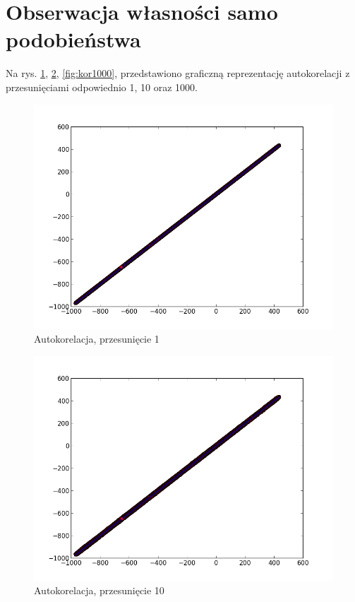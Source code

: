 \documentclass[a4paper, 12pt]{article}
\begin{document}
\section{Obserwacja własności samo podobieństwa}
Na rys. \ref{fig:kor1}, \ref{fig:kor10}, \ref{fig:kor1000}, przedstawiono graficzną reprezentację autokorelacji z przesunięciami odpowiednio 1, 10 oraz 1000.
\begin{figure}[h]
\includegraphics[scale=0.5]{out1.png}
\caption{Autokorelacja, przesunięcie 1}
\label{fig:kor1}
\end{figure}
\begin{figure}[h]
\includegraphics[scale=0.5]{out10.png}
\caption{Autokorelacja, przesunięcie 10}
\label{fig:kor10}
\end{figure}
\end{document}
